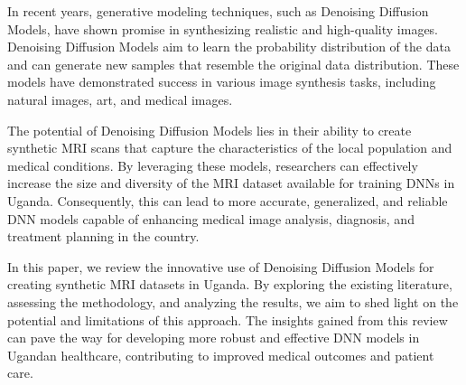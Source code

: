 In recent years, generative modeling techniques, such as Denoising Diffusion Models, have shown promise in synthesizing realistic and high-quality images. Denoising Diffusion Models aim to learn the probability distribution of the data and can generate new samples that resemble the original data distribution. These models have demonstrated success in various image synthesis tasks, including natural images, art, and medical images.

The potential of Denoising Diffusion Models lies in their ability to create synthetic MRI scans that capture the characteristics of the local population and medical conditions. By leveraging these models, researchers can effectively increase the size and diversity of the MRI dataset available for training DNNs in Uganda. Consequently, this can lead to more accurate, generalized, and reliable DNN models capable of enhancing medical image analysis, diagnosis, and treatment planning in the country.

In this paper, we review the innovative use of Denoising Diffusion Models for creating synthetic MRI datasets in Uganda. By exploring the existing literature, assessing the methodology, and analyzing the results, we aim to shed light on the potential and limitations of this approach. The insights gained from this review can pave the way for developing more robust and effective DNN models in Ugandan healthcare, contributing to improved medical outcomes and patient care.
